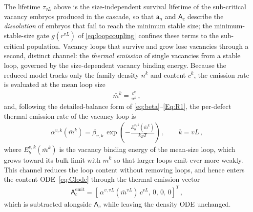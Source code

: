 \documentclass{article}
\newcommand{\spvec}[1]{\bm{\mathsf{#1}}}   %
\begin{document}
The lifetime $\tau_{vL}$ above is the size-independent survival lifetime of the sub-critical vacancy embryos produced in the cascade, so that $\spvec{a}_n$ and $\spvec{A}_c$ describe the \emph{dissolution} of embryos that fail to reach the minimum stable size; the minimum-stable-size gate $g(r^{vL})$ of \eqref{eq:loopcoupling} confines these terms to the sub-critical population. Vacancy loops that survive and grow lose vacancies through a second, distinct channel: the \emph{thermal emission} of single vacancies from a stable loop, governed by the size-dependent vacancy binding energy. Because the reduced model tracks only the family density $n^{k}$ and content $c^{k}$, the emission rate is evaluated at the mean loop size
\begin{align}\label{eq:meanloopsize}
\bar m^{k}=\frac{c^{k}}{n^{k}}\, ,
\end{align}
and, following the detailed-balance form of \eqref{eq:beta}--\eqref{Eq:R1}, the per-defect thermal-emission rate of the vacancy loop is
\begin{align}\label{eq:loopemission}
\alpha^{v,k}(\bar m^{k})=\beta_{v,k}\,\exp\!\left(-\frac{E_b^{v,k}(\bar m^{k})}{k_BT}\right)\, ,\qquad k=vL\, ,
\end{align}
where $E_b^{v,k}(\bar m^{k})$ is the vacancy binding energy of the mean-size loop, which grows toward its bulk limit with $\bar m^{k}$ so that larger loops emit ever more weakly. This channel reduces the loop content without removing loops, and hence enters the content ODE~\eqref{eq:CIode} through the thermal-emission vector
\begin{align}\label{eq:Aemit}
\spvec{A}_c^{\mathrm{emit}}=\left[\,\alpha^{v,vL}(\bar m^{vL})\,c^{vL},\,0,\,0,\,0\right]^T\, ,
\end{align}
which is subtracted alongside $\spvec{A}_c$ while leaving the density ODE unchanged.
\end{document}
